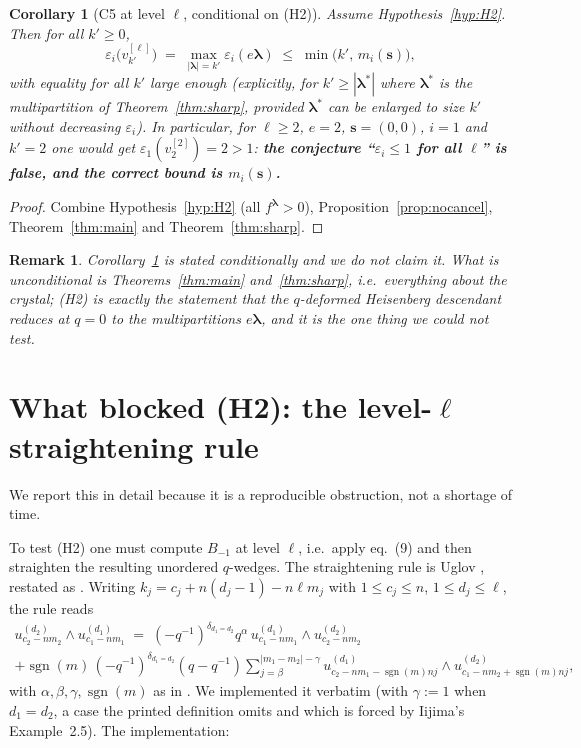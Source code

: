 \documentclass[11pt]{article}
\newtheorem{corollary}[theorem]{Corollary}
\newtheorem{remark}[theorem]{Remark}
\theoremstyle{definition}
\newcommand{\eps}{\varepsilon}
\newcommand{\bs}{\mathbf{s}}
\newcommand{\blam}{\boldsymbol{\lambda}}
\newcommand{\Bmi}{B_{-1}}
\begin{document}
\begin{corollary}[C5 at level $\ell$, conditional on (H2)]\label{cor:C5cond}
Assume Hypothesis~\ref{hyp:H2}. Then for all $k' \ge 0$,
\[
  \eps_i\bigl(v^{[\ell]}_{k'}\bigr)
  \;=\; \max_{|\blam| = k'} \eps_i(e\blam)
  \;\le\; \min\bigl(k',\, m_i(\bs)\bigr),
\]
with equality for all $k'$ large enough (explicitly, for
$k' \ge |\blam^\ast|$ where $\blam^\ast$ is the multipartition of
Theorem~\ref{thm:sharp}, provided $\blam^\ast$ can be enlarged to size
$k'$ without decreasing $\eps_i$). In particular, for $\ell \ge 2$,
$e = 2$, $\bs = (0,0)$, $i = 1$ and $k' = 2$ one would get
$\eps_1(v^{[2]}_2) = 2 > 1$: \textbf{the conjecture ``$\eps_i \le 1$ for
all $\ell$'' is false, and the correct bound is $m_i(\bs)$.}
\end{corollary}

\begin{proof}
Combine Hypothesis~\ref{hyp:H2} (all $f^{\blam} > 0$),
Proposition~\ref{prop:nocancel}, Theorem~\ref{thm:main} and
Theorem~\ref{thm:sharp}.
\end{proof}

\begin{remark}
Corollary~\ref{cor:C5cond} is stated conditionally and we do not claim it.
What is unconditional is Theorems~\ref{thm:main} and~\ref{thm:sharp},
i.e.\ everything about the crystal; (H2) is exactly the statement that
the $q$-deformed Heisenberg descendant reduces at $q = 0$ to the
multipartitions $e\blam$, and it is the one thing we could not test.
\end{remark}

\section{What blocked (H2): the level-$\ell$ straightening rule}\label{sec:blocked}

We report this in detail because it is a reproducible obstruction, not a
shortage of time.

To test (H2) one must compute $\Bmi$ at level $\ell$, i.e.\ apply
eq.~(9) and then straighten the resulting unordered $q$-wedges. The
straightening rule is Uglov \cite[Prop.~3.16]{Uglov2000}, restated as
\cite[Prop.~5.1]{Iijima2012}. Writing
$k_j = c_j + n(d_j-1) - n\ell m_j$ with $1 \le c_j \le n$, $1 \le d_j \le \ell$,
the rule reads
\begin{multline*}
  u^{(d_2)}_{c_2-nm_2} \wedge u^{(d_1)}_{c_1-nm_1}
  \;=\; (-q^{-1})^{\delta_{d_1 = d_2}} q^{\alpha}\,
        u^{(d_1)}_{c_1-nm_1} \wedge u^{(d_2)}_{c_2-nm_2} \\
   + \operatorname{sgn}(m)\,(-q^{-1})^{\delta_{d_1=d_2}}(q - q^{-1})
     \sum_{j=\beta}^{|m_1-m_2|-\gamma}
     u^{(d_1)}_{c_2 - nm_1 - \operatorname{sgn}(m) nj}
     \wedge
     u^{(d_2)}_{c_1 - nm_2 + \operatorname{sgn}(m) nj},
\end{multline*}
with $\alpha, \beta, \gamma, \operatorname{sgn}(m)$ as in
\cite[Prop.~5.1]{Iijima2012}. We implemented it verbatim (with
$\gamma := 1$ when $d_1 = d_2$, a case the printed definition omits and
which is forced by Iijima's Example~2.5). The implementation:
\end{document}
